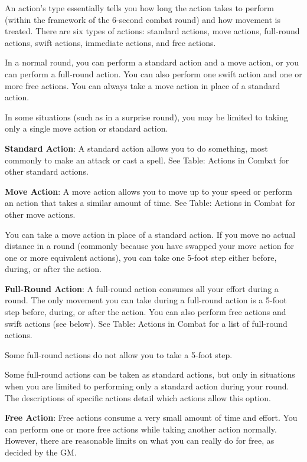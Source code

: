 				
An action's type essentially tells you how long the action takes to perform (within the framework of the 6-second combat round) and how movement is treated. There are six types of actions: standard actions, move actions, full-round actions, swift actions, immediate actions, and free actions.
				
In a normal round, you can perform a standard action and a move action, or you can perform a full-round action. You can also perform one swift action and one or more free actions. You can always take a move action in place of a standard action.
				
In some situations (such as in a surprise round), you may be limited to taking only a single move action or standard action.
				
\textbf{Standard Action}: A standard action allows you to do something, most commonly to make an attack or cast a spell. See Table: Actions in Combat for other standard actions.
				
\textbf{Move Action}: A move action allows you to move up to your speed or perform an action that takes a similar amount of time. See Table: Actions in Combat for other move actions.
				
You can take a move action in place of a standard action. If you move no actual distance in a round (commonly because you have swapped your move action for one or more equivalent actions), you can take one 5-foot step either before, during, or after the action.
				
\textbf{Full-Round Action}: A full-round action consumes all your effort during a round. The only movement you can take during a full-round action is a 5-foot step before, during, or after the action. You can also perform free actions and swift actions (see below). See Table: Actions in Combat for a list of full-round actions.
				
Some full-round actions do not allow you to take a 5-foot step.
				
Some full-round actions can be taken as standard actions, but only in situations when you are limited to performing only a standard action during your round. The descriptions of specific actions detail which actions allow this option.
				
\textbf{Free Action}: Free actions consume a very small amount of time and effort. You can perform one or more free actions while taking another action normally. However, there are reasonable limits on what you can really do for free, as decided by the GM.
				
